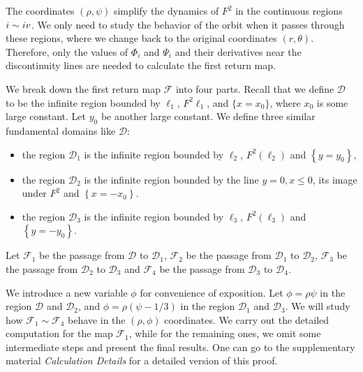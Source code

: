 \documentclass{article}
\def \Rone{\uppercase\expandafter{\romannumeral1}}
\def \Rfour{\uppercase\expandafter{\romannumeral4}}
\numberwithin{figure}{section}
\numberwithin{equation}{section}
\theoremstyle{remark}
\theoremstyle{definition}
\begin{document}
    The coordinates $(\rho,\psi)$ simplify the dynamics of $F^2$ in the continuous regions $\Rone\sim\Rfour$. We only need to study the behavior of the orbit when it passes through these regions, where we  change back to the original coordinates $(r,\theta)$. Therefore, only the values of $\Phi_i$ and $\Psi_i$ and their derivatives near the discontinuity lines are needed to calculate the first return map.

    We break down the first return map $\mathcal{F}$ into four parts. Recall that we define 
\(\mathcal{D}\) to be the infinite region bounded by \(\ell_{1}\), \(F^{2}\ell_{1}\),
and \(\{ x = x_{0}\}\), where $x_0$ is some large constant. Let $y_0$ be another large constant. We define three similar fundamental domains like $\mathcal{D}$: 
\begin{itemize}
    \item the region $\mathcal{D}_1$ is the infinite region bounded by $\ell_2$, $F^2(\ell_2)$ and $\left\{y=y_0\right\}$, 
    \item the region $\mathcal{D}_2$ is the infinite region bounded by the line $y=0,x\leq0$, its image under $F^2$ and $\left\{x=-x_0\right\}$.
    \item the region $\mathcal{D}_3$ is the infinite region bounded by $\ell_3$, $F^2(\ell_3)$ and $\left\{y=-y_0\right\}$. 
\end{itemize}
Let $\mathcal{F}_1$ be the passage from $\mathcal{D}$ to $\mathcal{D}_1$, $\mathcal{F}_2$ be the passage from $\mathcal{D}_1$ to $\mathcal{D}_2$, $\mathcal{F}_3$ be the passage from $\mathcal{D}_2$ to $\mathcal{D}_3$ and $\mathcal{F}_4$ be the passage from $\mathcal{D}_3$ to $\mathcal{D}_4$. 
    
    We introduce a new variable $\phi$ for convenience of exposition. Let $\phi=\rho\psi$ in the region $\mathcal{D}$ and $\mathcal{D}_2$, and $\phi=\rho\left(\psi-1/3\right)$ in the region $\mathcal{D}_1$ and $\mathcal{D}_3$. {\color{red} We will study how $\mathcal{F}_1\sim\mathcal{F}_4$ behave in the $(\rho,\phi)$ coordinates. We carry out the detailed computation for the map $\mathcal{F}_1$, while for the remaining ones, we omit some intermediate steps and present the final results. One can go to the supplementary material \emph{Calculation Details} for a detailed version of this proof.}
\end{document}
